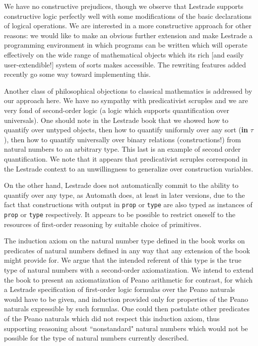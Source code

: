\documentclass[12pt]{article}
\begin{document}
We have no constructive prejudices, though we observe that Lestrade supports constructive logic perfectly well with some modifications of the basic declarations of logical operations.  We are interested in a more constructive approach for other reasons:  we would like to make an obvious further extension and make Lestrade a programming environment in which programs can be written which will operate effectively on the wide range of mathematical objects which its rich [and easily user-extendible!]  system of sorts makes accessible.  The rewriting features added recently go some way toward implementing this.

Another class of philosophical objections to classical mathematics is addressed by our approach here.   We have no sympathy with predicativist scruples and we are very fond of second-order logic (a logic which supports quantification over universals).   One should note in the Lestrade book that we showed how to quantify over untyped objects, then how to quantify uniformly over any sort ({\bf in} $\tau$), then how to quantify universally over binary relations (constructions!) from natural numbers to an arbitrary type.  This last is an example of second order quantification.  We note that it appears that predicativist scruples correspond in the Lestrade context to an unwillingness to generalize over construction variables.

On the other hand, Lestrade does not automatically commit to the ability to quantify over any type, as Automath does, at least in later versions, due to the fact that constructions with output in {\tt prop} or {\tt type} are also typed as instances of {\tt prop} or {\tt type} respectively.  It appears to be possible to restrict oneself to the resources of first-order reasoning by suitable choice of primitives.

The induction axiom on the natural number type defined in the book works on predicates of natural numbers defined in any way that any extension of the book might provide for.
We argue that the intended referent of this type is the true type of natural numbers with a second-order axiomatization.  We intend to extend the book to present an axiomatization of Peano arithmetic for contrast, for which a Lestrade specification of first-order logic formulas over the Peano naturals would have to be given, and induction provided only for properties of the Peano naturals expressible by such formulas.  One could then postulate other predicates of the Peano naturals which did not respect this induction axiom, thus supporting reasoning about ``nonstandard" natural numbers which would not be possible for the type of natural numbers currently described.
\end{document}
